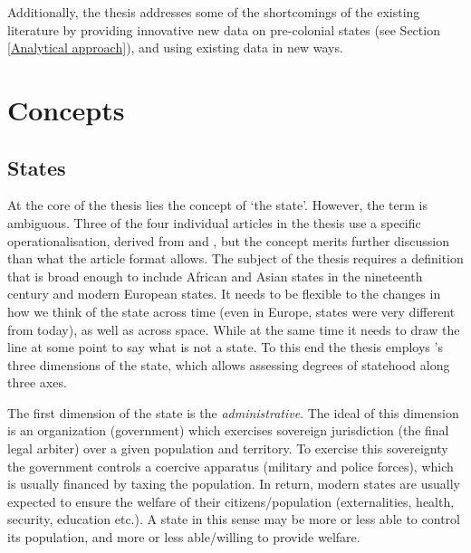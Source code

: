 Additionally, the thesis addresses some of the shortcomings of the existing
literature by providing innovative new data on pre-colonial states (see Section
\ref{Analytical approach}), and using existing data in new ways.

\section{Concepts} \label{Concepts}

\subsection{States} \label{States}

At the core of the thesis lies the concept of `the state'. However, the term is
ambiguous. Three of the four individual articles in the thesis use a specific
operationalisation, derived from \citet{Butcher2019} and \citet{Butcher2017},
but the concept merits further discussion than what the article format allows.
The subject of the thesis requires a definition that is broad enough to include
African and Asian states in the nineteenth century and modern European states.
It needs to be flexible to the changes in how we think of the state across time
(even in Europe, states were very different from today), as well as across
space. While at the same time it needs to draw the line at some point to say
what is not a state. To this end the thesis employs \citet{Clapham1996}'s three
dimensions of the state, which allows assessing degrees of statehood along three
axes.

The first dimension of the state is the \textit{administrative}. The ideal of
this dimension is an organization (government) which exercises sovereign jurisdiction
(the final legal arbiter) over a given population and territory. To exercise
this sovereignty the government controls a coercive apparatus (military and
police forces), which is usually financed by taxing the population. In return,
modern states are usually expected to ensure the welfare of their
citizens/population (externalities, health, security, education etc.). A state
in this sense may be more or less able to control its population, and more or
less able/willing to provide welfare.


